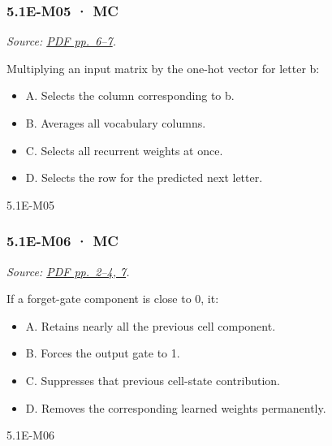 \noindent\begin{minipage}{\linewidth}

\subsubsection{5.1E-M05 · MC}\label{e-m05-mc}

\emph{Source:
\href{../Lecture\%20Slides/5.1.\%20Extra\%20Material.pdf\#page=6}{PDF
pp.~6--7}.}

Multiplying an input matrix by the one-hot vector for letter b:

\begin{itemize}
\tightlist
\item
  A. Selects the column corresponding to b.
\item
  B. Averages all vocabulary columns.
\item
  C. Selects all recurrent weights at once.
\item
  D. Selects the row for the predicted next letter.
\end{itemize}

\begin{solution}[8mm]{5.1E-M05}

\end{solution}
\end{minipage}\par\medskip

\noindent\begin{minipage}{\linewidth}

\subsubsection{5.1E-M06 · MC}\label{e-m06-mc}

\emph{Source:
\href{../Lecture\%20Slides/5.1.\%20Extra\%20Material.pdf\#page=2}{PDF
pp.~2--4, 7}.}

If a forget-gate component is close to 0, it:

\begin{itemize}
\tightlist
\item
  A. Retains nearly all the previous cell component.
\item
  B. Forces the output gate to 1.
\item
  C. Suppresses that previous cell-state contribution.
\item
  D. Removes the corresponding learned weights permanently.
\end{itemize}

\begin{solution}[8mm]{5.1E-M06}

\end{solution}
\end{minipage}\par\medskip

